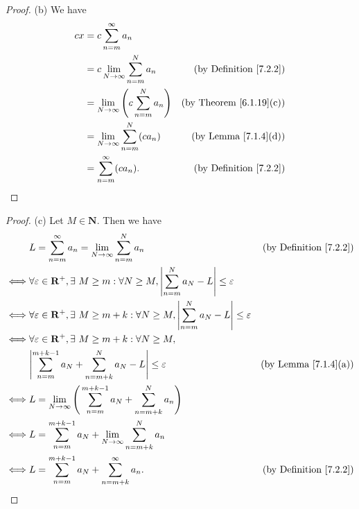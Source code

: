 \begin{proof}{(b)}
    We have
    \begin{align*}
        cx & = c \sum_{n = m}^\infty a_n                                                                  \\
           & = c \lim_{N \to \infty} \sum_{n = m}^N a_n             & \text{(by Definition \ref{7.2.2})}  \\
           & = \lim_{N \to \infty} \Bigg(c \sum_{n = m}^N a_n\Bigg) & \text{(by Theorem \ref{6.1.19}(c))} \\
           & = \lim_{N \to \infty} \sum_{n = m}^N (c a_n)           & \text{(by Lemma \ref{7.1.4}(d))}    \\
           & = \sum_{n = m}^\infty (c a_n).                         & \text{(by Definition \ref{7.2.2})}
    \end{align*}
\end{proof}

\begin{proof}{(c)}
    Let \(M \in \mathbf{N}\).
    Then we have
    \begin{align*}
             & L = \sum_{n = m}^\infty a_n = \lim_{N \to \infty} \sum_{n = m}^N a_n                                                           & \text{(by Definition \ref{7.2.2})} \\
        \iff & \forall \varepsilon \in \mathbf{R}^+, \exists\ M \geq m : \forall N \geq M, \abs*{\sum_{n = m}^N a_N - L} \leq \varepsilon                                          \\
        \iff & \forall \varepsilon \in \mathbf{R}^+, \exists\ M \geq m + k : \forall N \geq M, \abs*{\sum_{n = m}^N a_N - L} \leq \varepsilon                                      \\
        \iff & \forall \varepsilon \in \mathbf{R}^+, \exists\ M \geq m + k : \forall N \geq M,                                                                                     \\
             & \abs*{\sum_{n = m}^{m + k - 1} a_N + \sum_{n = m + k}^N a_N - L} \leq \varepsilon                                              & \text{(by Lemma \ref{7.1.4}(a))}   \\
        \iff & L = \lim_{N \to \infty} \Bigg(\sum_{n = m}^{m + k - 1} a_N + \sum_{n = m + k}^N a_n\Bigg)                                                                           \\
        \iff & L = \sum_{n = m}^{m + k - 1} a_N + \lim_{N \to \infty} \sum_{n = m + k}^N a_n                                                                                       \\
        \iff & L = \sum_{n = m}^{m + k - 1} a_N + \sum_{n = m + k}^\infty a_n.                                                                & \text{(by Definition \ref{7.2.2})}
    \end{align*}
\end{proof}

